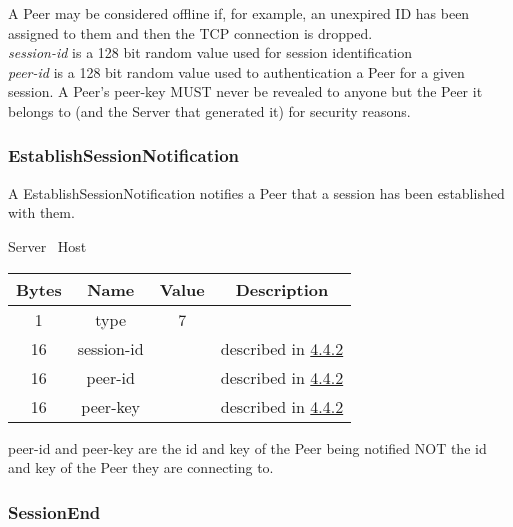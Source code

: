 A Peer may be considered offline if, for example, an unexpired ID has been assigned to them and then the TCP
connection is dropped.\\

\emph{session-id} is a 128 bit random value used for session identification\\

\emph{peer-id} is a 128 bit random value used to authentication a Peer for a given session. A Peer's peer-key MUST
never be revealed to anyone but the Peer it belongs to (and the Server that generated it)
for security reasons.\\

\subsubsection{EstablishSessionNotification}

A EstablishSessionNotification notifies a Peer that a session has been established with them.

\begin{center}
    Server \textrightarrow\ Host\\
    \begin{tabular}{|c|c|c|c|}
        \hline
        \textbf{Bytes} & \textbf{Name} & \textbf{Value} & \textbf{Description}                                \\
        \hline
        1              & type          & 7              &                                                     \\
        \hline
        16             & session-id    &                & described in \hyperlink{subsubsection.4.4.2}{4.4.2} \\
        \hline
        16             & peer-id       &                & described in \hyperlink{subsubsection.4.4.2}{4.4.2} \\
        \hline
        16             & peer-key      &                & described in \hyperlink{subsubsection.4.4.2}{4.4.2} \\
        \hline
    \end{tabular}
\end{center}

peer-id and peer-key are the id and key of the Peer being notified NOT the id and key of the Peer they are connecting
to.

\subsubsection{SessionEnd}

